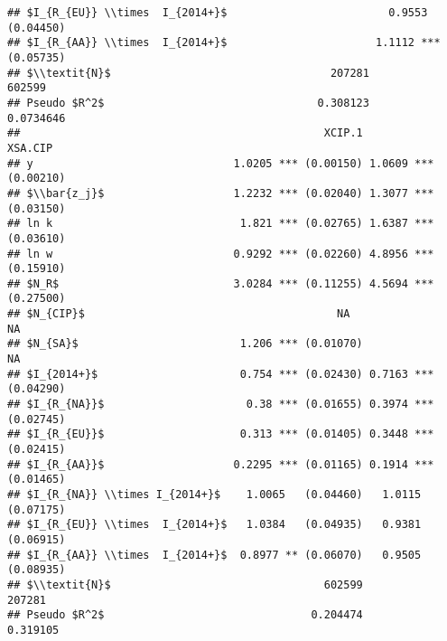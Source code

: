 \documentclass[
]{article}
\begin{document}
\begin{verbatim}
## $I_{R_{EU}} \\times  I_{2014+}$                         0.9553   (0.04450)
## $I_{R_{AA}} \\times  I_{2014+}$                       1.1112 *** (0.05735)
## $\\textit{N}$                                  207281               602599
## Pseudo $R^2$                                 0.308123            0.0734646
##                                               XCIP.1              XSA.CIP
## y                               1.0205 *** (0.00150) 1.0609 *** (0.00210)
## $\\bar{z_j}$                    1.2232 *** (0.02040) 1.3077 *** (0.03150)
## ln k                             1.821 *** (0.02765) 1.6387 *** (0.03610)
## ln w                            0.9292 *** (0.02260) 4.8956 *** (0.15910)
## $N_R$                           3.0284 *** (0.11255) 4.5694 *** (0.27500)
## $N_{CIP}$                                       NA                   NA  
## $N_{SA}$                         1.206 *** (0.01070)                 NA  
## $I_{2014+}$                      0.754 *** (0.02430) 0.7163 *** (0.04290)
## $I_{R_{NA}}$                      0.38 *** (0.01655) 0.3974 *** (0.02745)
## $I_{R_{EU}}$                     0.313 *** (0.01405) 0.3448 *** (0.02415)
## $I_{R_{AA}}$                    0.2295 *** (0.01165) 0.1914 *** (0.01465)
## $I_{R_{NA}} \\times I_{2014+}$    1.0065   (0.04460)   1.0115   (0.07175)
## $I_{R_{EU}} \\times  I_{2014+}$   1.0384   (0.04935)   0.9381   (0.06915)
## $I_{R_{AA}} \\times  I_{2014+}$  0.8977 ** (0.06070)   0.9505   (0.08935)
## $\\textit{N}$                                 602599               207281
## Pseudo $R^2$                                0.204474             0.319105
\end{verbatim}
\end{document}

